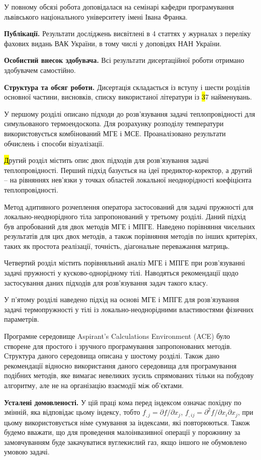 У повному обсязі робота доповідалася на семінарі кафедри програмування львівського національного університету імені
Івана Франка.

\textbf{Публікації.} Результати досліджень висвітлені в 4 статтях у журналах з переліку фахових видань ВАК України, в
тому числі у доповідях НАН України.

\textbf{Особистий внесок здобувача.} Всі результати дисертаційної роботи отримано здобувачем самостійно.

\textbf{Структура та обсяг роботи.} Дисертація складається із вступу і шести розділів основної частини, висновків,
списку використаної літератури із {\hl 37} найменувань.

У першому розділі описано підходи до розв'язування задачі теплопровідності для симульованого термоендоскопа. Для 
розрахунку розподілу температури використовується комбінований МГЕ і МСЕ. Проаналізовано результати обчислень і способи
візуалізації.

{\hl Другий розділ містить опис двох підходів для розв'язування задачі теплопровідності. Перший підхід базується на ідеї
предиктор-коректор, а другий -- на рівняннях нев'язки у точках областей локальної неоднорідності коефіцієнта
теплопровідності.

Метод адитивного розчеплення оператора застосований для задачі пружності для локально-неоднорідного тіла запропонований
у третьому розділі. Даний підхід був апробований для двох методів МГЕ і МПГЕ. Наведено порівняння чисельних результатів
для цих двох методів, а також порівняння методів по інших критеріях, таких як простота реалізації, точність, діагональне
переважання матриць.

Четвертий розділ містить порівняльний аналіз МГЕ і МПГЕ при розв'язуванні задачі пружності у кусково-однорідному тілі.
Наводяться рекомендації щодо застосування даних підходів для розв'язування задач такого класу.

У п'ятому розділі наведено підхід на основі МГЕ і МПГЕ для розв'язування задачі термопружності у тілі із
локально-неоднорідними властивостями фізичних параметрів.}

Програмне середовище Aspirant's Calculations Environment (ACE) було створене для простого і зручного програмування
запропонованих методів. Структура даного середовища описана у шостому розділі. Також дано рекомендації відносно
використання даного середовища для програмування подібних методів, яке вимагає невеликих зусиль спрямованих тільки на
побудову алгоритму, але не на організацію взаємодії між об'єктами.

\textbf{Усталені домовленості.} У цій праці кома перед індексом означає похідну по змінній, яка відповідає цьому
індексу, тобто ${f_{,j} = \partial}{f/\partial}x_{j}$, ${{f_{,ij} = \partial^{2}}{f/\partial}x_{i}\partial x_{j}}{}$,
при цьому використовується німе сумування за індек­сами, які повторюються. Також будемо вважати, що для проведення 
малоінвазивної операції у порожнину за замовчуванням буде закачуватися вуглекислий газ, якщо іншого не обумовлено умовою
задачі. 
